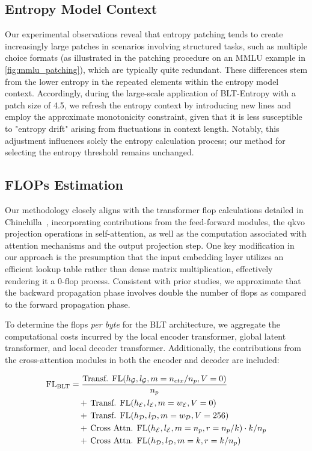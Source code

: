 \subsection{Entropy Model Context}
\label{section:entropy-context}
Our experimental observations reveal that entropy patching tends to create increasingly large patches in scenarios involving structured tasks, such as multiple choice formats (as illustrated in the patching procedure on an MMLU example in \autoref{fig:mmlu_patching}), which are typically quite redundant. These differences stem from the lower entropy in the repeated elements within the entropy model context. Accordingly, during the large-scale application of {\textsc BLT}-Entropy with a patch size of 4.5, we refresh the entropy context by introducing new lines and employ the approximate monotonicity constraint, given that it is less susceptible to "entropy drift" arising from fluctuations in context length. Notably, this adjustment influences solely the entropy calculation process; our method for selecting the entropy threshold remains unchanged.

\subsection{FLOPs Estimation} 
\label{section:flops}

Our methodology closely aligns with the transformer flop calculations detailed in Chinchilla~\citep{hoffmann2022training}, incorporating contributions from the feed-forward modules, the qkvo projection operations in self-attention, as well as the computation associated with attention mechanisms and the output projection step. One key modification in our approach is the presumption that the input embedding layer utilizes an efficient lookup table rather than dense matrix multiplication, effectively rendering it a 0-flop process. Consistent with prior studies, we approximate that the backward propagation phase involves double the number of flops as compared to the forward propagation phase.

To determine the flops \textit{per byte} for the {\textsc BLT} architecture, we aggregate the computational costs incurred by the local encoder transformer, global latent transformer, and local decoder transformer. Additionally, the contributions from the cross-attention modules in both the encoder and decoder are included:

\begin{align}
    \text{FL}_{\text{{\textsc BLT}}} &= \frac{\text{Transf. FL}(h_{\mathcal{G}}, l_{\mathcal{G}}, m=n_{ctx}/n_p, V=0)}{n_p}\\
    &\quad +\, \text{Transf. FL}(h_{\mathcal{E}}, l_{\mathcal{E}}, m=w_{\mathcal{E}}, V=0) \\
    &\quad +\, \text{Transf. FL}(h_{\mathcal{D}}, l_{\mathcal{D}}, m=w_{\mathcal{D}}, V=256) \\ 
    &\quad +\, \text{Cross Attn. FL}(h_{\mathcal{E}}, l_{\mathcal{E}}, m=n_p, r=n_p/k) \cdot k/n_p \\ 
    &\quad +\, \text{Cross Attn. FL}(h_{\mathcal{D}}, l_{\mathcal{D}}, m=k, r=k/n_p)
\end{align}

